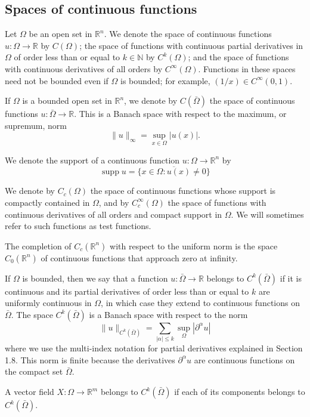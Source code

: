 \documentclass[10pt]{article}
\theoremstyle{plain}
\theoremstyle{definition}
\theoremstyle{remark}
\begin{document}
\subsection{Spaces of continuous functions}
Let $\Omega$ be an open set in $\mathbb{R}^{n}$. We denote the space of continuous functions $u: \Omega \rightarrow \mathbb{R}$ by $C(\Omega)$; the space of functions with continuous partial derivatives in $\Omega$ of order less than or equal to $k \in \mathbb{N}$ by $C^{k}(\Omega)$; and the space of functions with continuous derivatives of all orders by $C^{\infty}(\Omega)$. Functions in these spaces need not be bounded even if $\Omega$ is bounded; for example, $(1/x) \in C^{\infty}(0,1)$.

If $\Omega$ is a bounded open set in $\mathbb{R}^{n}$, we denote by $C(\bar{\Omega})$ the space of continuous functions $u: \bar{\Omega} \rightarrow \mathbb{R}$. This is a Banach space with respect to the maximum, or supremum, norm
$$
\|u\|_{\infty}=\sup _{x \in \Omega}|u(x)| .
$$

We denote the support of a continuous function $u: \Omega \rightarrow \mathbb{R}^{n}$ by
$$
\operatorname{supp} u=\overline{\{x \in \Omega: u(x) \neq 0\}}
$$

We denote by $C_{c}(\Omega)$ the space of continuous functions whose support is compactly contained in $\Omega$, and by $C_{c}^{\infty}(\Omega)$ the space of functions with continuous derivatives of all orders and compact support in $\Omega$. We will sometimes refer to such functions as test functions.

The completion of $C_{c}\left(\mathbb{R}^{n}\right)$ with respect to the uniform norm is the space $C_{0}\left(\mathbb{R}^{n}\right)$ of continuous functions that approach zero at infinity.

If $\Omega$ is bounded, then we say that a function $u: \bar{\Omega} \rightarrow \mathbb{R}$ belongs to $C^{k}(\bar{\Omega})$ if it is continuous and its partial derivatives of order less than or equal to $k$ are uniformly continuous in $\Omega$, in which case they extend to continuous functions on $\bar{\Omega}$. The space $C^{k}(\bar{\Omega})$ is a Banach space with respect to the norm
$$
\|u\|_{C^{k}(\bar{\Omega})}=\sum_{|\alpha| \leq k} \sup _{\Omega}\left|\partial^{\alpha} u\right|
$$
where we use the multi-index notation for partial derivatives explained in Section 1.8. This norm is finite because the derivatives $\partial^{\alpha} u$ are continuous functions on the compact set $\bar{\Omega}$.

A vector field $X: \Omega \rightarrow \mathbb{R}^{m}$ belongs to $C^{k}(\bar{\Omega})$ if each of its components belongs to $C^{k}(\bar{\Omega})$.
\end{document}
